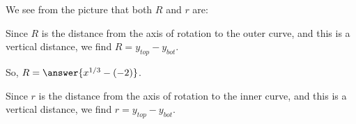 \documentclass{ximera}
\begin{document}
\begin{exercise}
\begin{exercise}
\begin{exercise}
\begin{image}
  \end{image}
            
 We see from the picture that both $R$ and $r$ are:
 \begin{multipleChoice}
 \end{multipleChoice}           
            
\begin{exercise}
Since $R$ is the distance from the axis of rotation to the outer curve, and this is a vertical distance, we find $R = y_{top}-y_{bot}$.
\begin{multipleChoice}
\end{multipleChoice}       

\begin{multipleChoice}
\end{multipleChoice}   

So, $R= \answer{x^{1/3}-(-2)}$.
 \end{exercise}
 
 \begin{exercise}

Since $r$ is the distance from the axis of rotation to the inner curve, and this is a vertical distance, we find $r = y_{top}-y_{bot}$.
\begin{multipleChoice}
\end{multipleChoice}       

\begin{multipleChoice}
\end{multipleChoice} 


\end{exercise}
\end{exercise}
\end{exercise}
\end{exercise}
\end{document}
